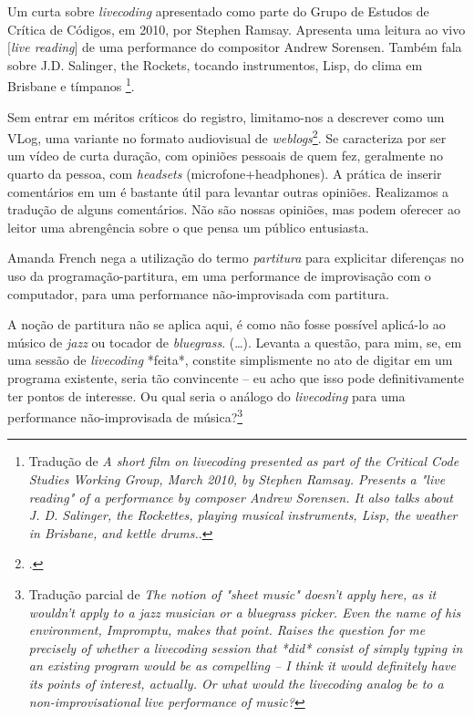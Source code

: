 \begin{citacao}
Um curta sobre \emph{livecoding} apresentado como parte do Grupo de Estudos de Crítica de Códigos, em 2010, por Stephen Ramsay. Apresenta uma leitura ao vivo $[$\emph{live reading}$]$ de uma performance do compositor Andrew Sorensen. Também fala sobre J.D. Salinger, the Rockets, tocando instrumentos, Lisp, do clima em Brisbane e tímpanos \footnote{ Tradução de \emph{A short film on livecoding presented as part of the Critical Code Studies Working Group, March 2010, by Stephen Ramsay. Presents a "live reading" of a performance by composer Andrew Sorensen. It also talks about J. D. Salinger, the Rockettes, playing musical instruments, Lisp, the weather in Brisbane, and kettle drums.}.}.
\end{citacao}

Sem entrar em méritos críticos do registro, limitamo-nos a descrever como um VLog, uma variante no formato audiovisual de \emph{weblogs}\footnote{.}. Se caracteriza por ser um vídeo de curta duração, com opiniões pessoais de quem fez, geralmente no quarto da pessoa, com \emph{headsets} (microfone+headphones). A prática de inserir comentários em um é bastante útil para levantar outras opiniões. Realizamos a tradução de alguns comentários. Não são nossas opiniões, mas podem oferecer ao leitor uma abrengência sobre o que pensa um público entusiasta.

Amanda French nega a utilização do termo \emph{partitura} para explicitar diferenças no uso da programação-partitura, em uma performance de improvisação com o computador, para uma performance não-improvisada com partitura.

\begin{citacao}
A noção de partitura não se aplica aqui, é como não fosse possível aplicá-lo ao músico de \emph{jazz} ou tocador de \emph{bluegrass}. (\ldots). Levanta a questão, para mim, se, em uma sessão de \emph{livecoding} *feita*, constite simplismente no ato de digitar em um programa existente, seria tão convincente -- eu acho que isso pode definitivamente ter pontos de interesse. Ou qual seria o análogo do \emph{livecoding} para uma performance não-improvisada de música?\footnote{ Tradução parcial de \emph{The notion of "sheet music" doesn't apply here, as it wouldn't apply to a jazz musician or a bluegrass picker. Even the name of his environment, Impromptu, makes that point. Raises the question for me precisely of whether a livecoding session that *did* consist of simply typing in an existing program would be as compelling -- I think it would definitely have its points of interest, actually. Or what would the livecoding analog be to a non-improvisational live performance of music?}}
\end{citacao}

